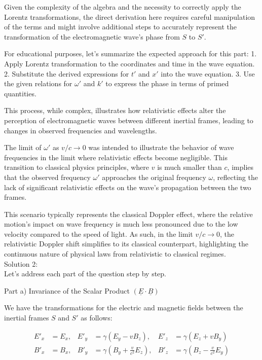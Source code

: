 \documentclass[a4paper,11pt]{article}
\begin{document}
Given the complexity of the algebra and the necessity to correctly apply the Lorentz transformations, the direct derivation here requires careful manipulation of the terms and might involve additional steps to accurately represent the transformation of the electromagnetic wave's phase from \( S \) to \( S' \).

For educational purposes, let's summarize the expected approach for this part:
1. Apply Lorentz transformation to the coordinates and time in the wave equation.
2. Substitute the derived expressions for \(t'\) and \(x'\) into the wave equation.
3. Use the given relations for \(\omega'\) and \(k'\) to express the phase in terms of primed quantities.

This process, while complex, illustrates how relativistic effects alter the perception of electromagnetic waves between different inertial frames, leading to changes in observed frequencies and wavelengths.

The limit of \(\omega'\) as \(v/c \rightarrow 0\) was intended to illustrate the behavior of wave frequencies in the limit where relativistic effects become negligible. This transition to classical physics principles, where \(v\) is much smaller than \(c\), implies that the observed frequency \(\omega'\) approaches the original frequency \(\omega\), reflecting the lack of significant relativistic effects on the wave's propagation between the two frames.

This scenario typically represents the classical Doppler effect, where the relative motion's impact on wave frequency is much less pronounced due to the low velocity compared to the speed of light. As such, in the limit \(v/c \rightarrow 0\), the relativistic Doppler shift simplifies to its classical counterpart, highlighting the continuous nature of physical laws from relativistic to classical regimes. \\

\noindent Solution 2: \\

Let's address each part of the question step by step.

Part a) Invariance of the Scalar Product \( (\underline{E} \cdot \underline{B}) \)

We have the transformations for the electric and magnetic fields between the inertial frames \( S \) and \( S' \) as follows:

\[
\begin{aligned}
E'_{x} &= E_{x}, & E'_{y} &= \gamma(E_{y} - vB_{z}), & E'_{z} &= \gamma(E_{z} + vB_{y}) \\
B'_{x} &= B_{x}, & B'_{y} &= \gamma(B_{y} + \frac{v}{c^{2}} E_{z}), & B'_{z} &= \gamma(B_{z} - \frac{v}{c^{2}} E_{y})
\end{aligned}
\]
\end{document}
